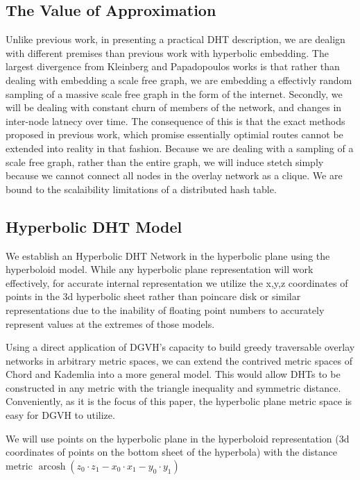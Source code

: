 \subsection{The Value of Approximation}
Unlike previous work, in presenting a practical DHT description, we are dealign with different premises than previous work with hyperbolic embedding.
The largest divergence from Kleinberg and Papadopoulos works is that rather than dealing with embedding a scale free graph, we are embedding a effectivly random sampling of a massive scale free graph in the form of the internet.
Secondly, we will be dealing with constant churn of members of the network, and changes in inter-node latnecy over time.
The consequence of this is that the exact methods proposed in previous work, which promise essentially optimial routes cannot be extended into reality in that fashion.
Because we are dealing with a sampling of a scale free graph, rather than the entire graph, we will induce stetch simply because we cannot connect all nodes in the overlay network as a clique. 
We are bound to the scalaibility limitations of a distributed hash table.


\subsection{Hyperbolic DHT Model}

We establish an Hyperbolic DHT Network in the hyperbolic plane using the hyperboloid model. While any hyperbolic plane representation will work effectively, for accurate internal representation we utilize the x,y,z coordinates of points in the 3d hyperbolic sheet rather than poincare disk or similar representations due to the inability of floating point numbers to accurately represent values at the extremes of those models.


Using a direct application of DGVH's capacity to build greedy traversable overlay networks in arbitrary metric spaces, we can extend the contrived metric spaces of Chord and Kademlia into a more general model. This would allow DHTs to be constructed in any metric with the triangle inequality and symmetric distance. Conveniently, as it is the focus of this paper, the hyperbolic plane metric space is easy for DGVH to utilize.

We will use points on the hyperbolic plane in the hyperboloid representation\cite{jansen1909abbildung} (3d coordinates of points on the bottom sheet of the hyperbola) with the distance metric $\operatorname{arcosh} (z_{0} \cdot z_{1} - x_{0} \cdot x_{1} - y_{0} \cdot y_{1})$

